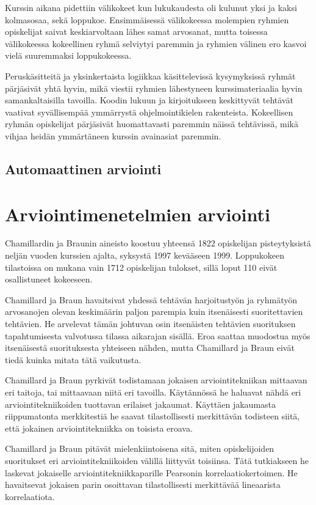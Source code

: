 \documentclass[finnish]{../tktltiki2}
\theoremstyle{definition}
\theoremstyle{remark}
\begin{document}
Kurssin aikana pidettiin välikokeet kun lukukaudesta oli kulunut yksi ja kaksi kolmasosaa, sekä loppukoe. Ensimmäisessä välikokeessa molempien ryhmien opiskelijat saivat keskiarvoltaan lähes samat arvosanat, mutta toisessa välikokeessa kokeellinen ryhmä selviytyi paremmin ja ryhmien välinen ero kasvoi vielä suuremmaksi loppukokeessa.

Peruskäsitteitä ja yksinkertaista logiikkaa käsittelevissä kysymyksissä ryhmät pärjäsivät yhtä hyvin, mikä viestii ryhmien lähestyneen kurssimateriaalia hyvin samankaltaisilla tavoilla. Koodin lukuun ja kirjoitukseen keskittyvät tehtävät vaativat syvällisempää ymmärrystä ohjelmointikielen rakenteista. Kokeellisen ryhmän opiskelijat pärjäsivät huomattavasti paremmin näissä tehtävissä, mikä vihjaa heidän ymmärtäneen kurssin avainasiat paremmin.

\subsection{Automaattinen arviointi}



\section{Arviointimenetelmien arviointi}

Chamillardin ja Braunin aineisto koostuu yhteensä 1822 opiskelijan pisteytyksistä neljän vuoden kurssien ajalta, syksystä 1997 kevääseen 1999. Loppukokeen tilastoissa on mukana vain 1712 opiskelijan tulokset, sillä loput 110 eivät osallistuneet kokeeseen.

Chamillard ja Braun havaitsivat yhdessä tehtävän harjoitustyön ja ryhmä\-työn arvosanojen olevan keskimäärin paljon parempia kuin itsenäisesti suoritettavien tehtävien. He arvelevat tämän johtuvan osin itsenäisten tehtävien suorituksen tapahtumisesta valvotussa tilassa aikarajan sisällä. Eroa saattaa muodostua myös itsenäisestä suorituksesta yhteiseen nähden, mutta Chamillard ja Braun eivät tiedä kuinka mitata tätä vaikutusta.

Chamillard ja Braun pyrkivät todistamaan jokaisen arviointitekniikan mittaavan eri taitoja, tai mittaavaan niitä eri tavoilla. Käytännössä he haluavat nähdä eri arviointitekniikoiden tuottavan erilaiset jakaumat. Käyttäen jakaumasta riippumatonta merkkitestiä he saavat tilastollisesti merkittävän todisteen siitä, että jokainen arviointitekniikka on toisista eroava.

Chamillard ja Braun pitävät mielenkiintoisena sitä, miten opiskelijoiden suoritukset eri arviointitekniikoiden välillä liittyvät toisiinsa. Tätä tutkiakseen he laskevat jokaiselle arviointitekniikkaparille Pearsonin korrelaatiokertoimen. He havaitsevat jokaisen parin osoittavan tilastollisesti merkittävää lineaarista korrelaatiota.
\end{document}
